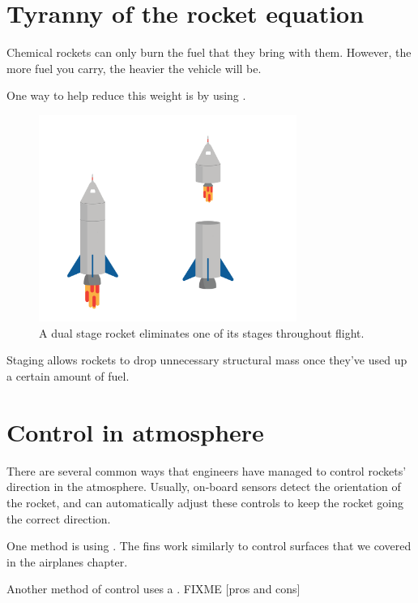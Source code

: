 \section{Tyranny of the rocket equation}
	Chemical rockets can only burn the fuel that they bring with them. However, the more fuel you carry, the heavier the vehicle will be.

 

	One way to help reduce this weight is by using . 
	\begin{figure}[htbp]
    \centering
	\includegraphics[width=0.75\textwidth]{stagingDual.png}
    \caption{A dual stage rocket eliminates one of its stages throughout flight.}
    \label{fig:dualStaged}
\end{figure}
	Staging allows rockets to drop unnecessary structural mass once they've used up a certain amount of fuel. 



\section{Control in atmosphere} 
There are several common ways that engineers have managed to control rockets' direction in the atmosphere. Usually, on-board sensors detect the orientation of the rocket, and can automatically adjust these controls to keep the rocket going the correct direction.

	
	One method is using . The fins work similarly to control surfaces that we covered in the airplanes chapter. 



	Another method of control uses a . FIXME [pros and cons]
	
